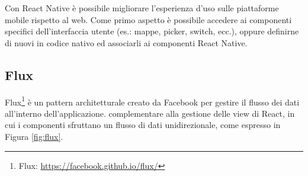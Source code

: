 Con React Native è possibile migliorare l'esperienza d'uso sulle piattaforme mobile rispetto al web. Come primo aspetto è possibile accedere ai componenti specifici dell'interfaccia utente (es.: mappe, picker, switch, ecc.), oppure definirne di nuovi in codice nativo ed associarli ai componenti React Native.

\subsection{Flux}\label{sec:flux}

Flux\footnote{Flux: \url{https://facebook.github.io/flux/}} è un pattern architetturale creato da Facebook per gestire il flusso dei dati all'interno dell'applicazione. \upe complementare alla gestione delle view di React, in cui i componenti sfruttano un flusso di dati unidirezionale, come espresso in Figura \ref{fig:flux}.

